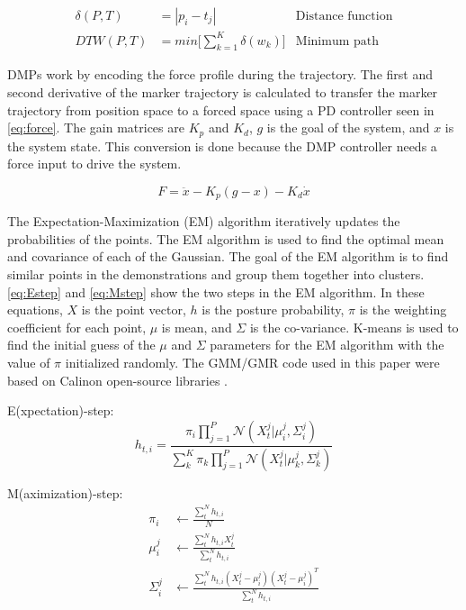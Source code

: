 \begin{equation} 
    \begin{aligned} 
         \delta (P,T) &= | p_i - t_j| & \text{Distance function} \\ 
        DTW(P,T) &= min \Bigg[ \sum_{k=1}^{K} \delta (w_k) \Bigg] & \text{Minimum path} 
    \end{aligned} 
    \label{eq:DTW} 
\end{equation} 


DMPs work by encoding the force profile during the trajectory. The first and second derivative of the marker trajectory is calculated to transfer the marker trajectory from position space to a forced space using a PD controller seen in \autoref{eq:force}. The gain matrices are $K_p$ and $K_d$, $g$ is the goal of the system, and $x$ is the system state. This conversion is done because the DMP controller needs a force input to drive the system.

\begin{equation}
    F = \ddot{x} - K_p (g - x) - K_d\dot{x}
    \label{eq:force}
\end{equation}



The Expectation-Maximization (EM) algorithm iteratively updates the probabilities of the points. The EM algorithm is used to find the optimal mean and covariance of each of the Gaussian. The goal of the EM algorithm is to find similar points in the demonstrations and group them together into clusters. \autoref{eq:Estep} and \autoref{eq:Mstep} show the two steps in the EM algorithm. In these equations, $X$ is the point vector, $h$ is the posture probability, $\pi$ is the weighting coefficient for each point, $\mu$ is mean, and $ \Sigma $ is the co-variance.  K-means is used to find the initial guess of the $\mu$ and $\Sigma$ parameters for the EM algorithm with the value of $\pi$ initialized randomly. The GMM/GMR code used in this paper were based on Calinon open-source libraries \cite{Calinon19MM} \cite{CalinonLee19} \cite{Calinon16JIST}. 

E(xpectation)-step: 
\begin{equation} 
     h_{t,i} = \frac{\pi_i \prod_{j=1}^{P} \mathcal{N}(X_t^j | \mu_i^j , \Sigma_i^j )}{ \sum_k^K \pi_k \prod_{j=1}^{P} \mathcal{N}(X_t^j | \mu_k^j , \Sigma_k^j ) } 
     \label{eq:Estep} 
\end{equation}{} 

M(aximization)-step: 
\begin{equation} 
\begin{aligned} 
    \pi_i &\leftarrow \frac{\sum_t^N h_{t,i}}{N} \\ 
    \mu_i^j &\leftarrow \frac{\sum_t^N h_{t,i} X_t^j}{\sum_t^N h_{t,i}} \\ 
    \Sigma_i^j &\leftarrow \frac{\sum_t^N h_{t,i} ( X_t^j - \mu_i^j)  ( X_t^j - \mu_i^j)^T   }{\sum_t^N h_{t,i}}  
\end{aligned} 
\label{eq:Mstep} 
\end{equation} 



